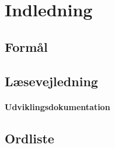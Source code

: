 \chapter{Indledning}
\section{Formål}

\section{Læsevejledning}

\subsubsection{Udviklingsdokumentation}

\section{Ordliste}
